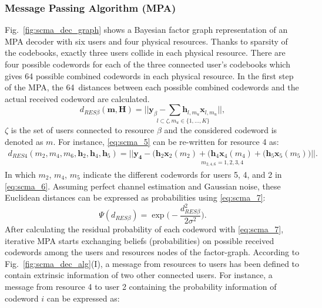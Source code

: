 \subsubsection{Message Passing Algorithm (MPA)}
\label{sec:scma_mpa}

Fig.~\ref{fig:scma_dec_graph} shows a Bayesian factor graph representation of an
MPA decoder with six users and four physical resources. Thanks to sparsity of
the codebooks, exactly three users collide in each physical resource. There are
four possible codewords for each of the three connected user's codebooks which
gives 64 possible combined codewords in each physical resource. In the first
step of the MPA, the 64~distances between each possible combined codewords and
the actual received codeword are calculated.
\begin{equation}
  \label{eq:scma_5}
  d_{RES  \beta}(\bm{m}, \bm{H}) =
  \underset{l \subset \zeta, m_u\in\{1,...,K\}}{||\bm{y}_\beta -
  \sum \bm{h}_{l,m_u} \bm{x}_{l,m_u} ||},
\end{equation}
$\zeta$ is the set of users connected to resource $\beta$ and the
considered codeword is denoted as $m$. For instance, \eqref{eq:scma_5} can be
re-written for resource 4 as:
\begin{equation}
  \label{eq:scma_6}
  \begin{split}
  d_{RES 4}(m_2,m_4,m_6,\bm{h}_2, \bm{h}_4, \bm{h}_5) =
  \underset{m_{2,4,6}=1,2,3,4}{|| \bm{y_4} - \Big(\bm{h}_2\bm{x}_2(m_2) +
  (\bm{h}_4\bm{x}_4(m_4) + (\bm{h}_5\bm{x}_5(m_5) \Big) ||}.
  \end{split}
\end{equation}
In which $m_2$, $m_4$, $m_5$ indicate the different codewords for users 5, 4,
and 2 in \eqref{eq:scma_6}. Assuming perfect channel estimation and Gaussian
noise, these Euclidean distances can be expressed as probabilities using
\eqref{eq:scma_7}:
\begin{equation}
  \label{eq:scma_7}
  \Psi(d_{RES \beta}) = \exp \Bigg(-\frac{d_{RES \beta}^2}{2\sigma^2} \Bigg).
\end{equation}
After calculating the residual probability of each codeword with
\eqref{eq:scma_7}, iterative MPA starts exchanging beliefs (probabilities) on
possible received codewords among the users and resources nodes of the
factor-graph. According to Fig.~\ref{fig:scma_dec_alg}(I), a message from
resources to users has been defined to contain extrinsic information of two
other connected users. For instance, a message from resource 4 to user 2
containing the probability information of codeword $i$ can be expressed as:

